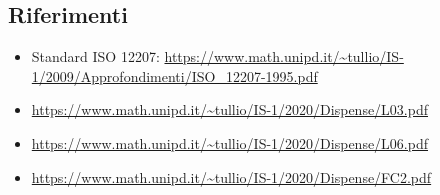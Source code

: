 \subsection{Riferimenti}
\label{ref}
        \begin{itemize}
            \item Standard ISO 12207:  \url{https://www.math.unipd.it/~tullio/IS-1/2009/Approfondimenti/ISO_12207-1995.pdf}
            \item \url{https://www.math.unipd.it/~tullio/IS-1/2020/Dispense/L03.pdf}
            \item \url{https://www.math.unipd.it/~tullio/IS-1/2020/Dispense/L06.pdf}
            \item \url{https://www.math.unipd.it/~tullio/IS-1/2020/Dispense/FC2.pdf}

        \end{itemize}

\pagebreak